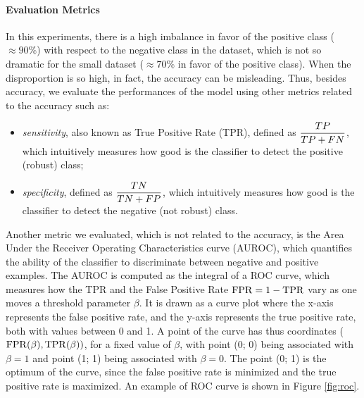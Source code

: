 \paragraph{Evaluation Metrics} In this experiments, there is a high imbalance in favor of the positive class ($\approx 90\%$) with respect to the negative class in the dataset, which is not so dramatic for the small dataset ($\approx 70\%$ in favor of the positive class). When the disproportion is so high, in fact, the accuracy can be misleading. Thus, besides accuracy, we evaluate the performances of the model using other metrics related to the accuracy such as:
\begin{itemize}
    \item \emph{sensitivity}, also known as True Positive Rate (TPR), defined as ${\displaystyle\frac{TP}{TP + FN}}$, which intuitively measures how good is the classifier to detect the positive (robust) class;
    \item \emph{specificity}, defined as ${\displaystyle\frac{TN}{TN + FP}}$, which intuitively measures how good is the classifier to detect the negative (not robust) class.
\end{itemize}
Another metric we evaluated, which is not related to the accuracy, is the Area Under the Receiver Operating Characteristics curve (AUROC), which quantifies the ability of the classifier to discriminate between negative and positive examples. The AUROC is computed as the integral of a ROC curve, which measures how the TPR and the False Positive Rate $\mathrm{FPR} = 1 - \mathrm{TPR}$ vary as one moves a threshold parameter $\beta$. It is drawn as a curve plot where the x-axis represents the false positive rate, and the y-axis represents the true positive rate, both with values between 0 and 1. A point of the curve has thus coordinates ($\mathrm{FPR}(\beta), \mathrm{TPR}(\beta))$, for a fixed value of $\beta$, with point (0; 0) being associated with $\beta = 1$ and point (1; 1) being associated with $\beta = 0$. The point (0; 1) is the optimum of the curve, since the false positive rate is minimized and the true positive rate is maximized. An example of ROC curve is shown in Figure \ref{fig:roc}.

